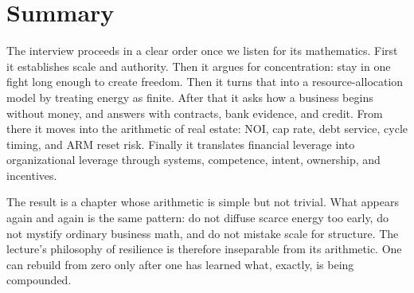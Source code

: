\section{Summary}

The interview proceeds in a clear order once we listen for its mathematics. First it establishes scale and authority. Then it argues for concentration: stay in one fight long enough to create freedom. Then it turns that into a resource-allocation model by treating energy as finite. After that it asks how a business begins without money, and answers with contracts, bank evidence, and credit. From there it moves into the arithmetic of real estate: \(\mathrm{NOI}\), cap rate, debt service, cycle timing, and ARM reset risk. Finally it translates financial leverage into organizational leverage through systems, competence, intent, ownership, and incentives.

The result is a chapter whose arithmetic is simple but not trivial. What appears again and again is the same pattern: do not diffuse scarce energy too early, do not mystify ordinary business math, and do not mistake scale for structure. The lecture's philosophy of resilience is therefore inseparable from its arithmetic. One can rebuild from zero only after one has learned what, exactly, is being compounded.